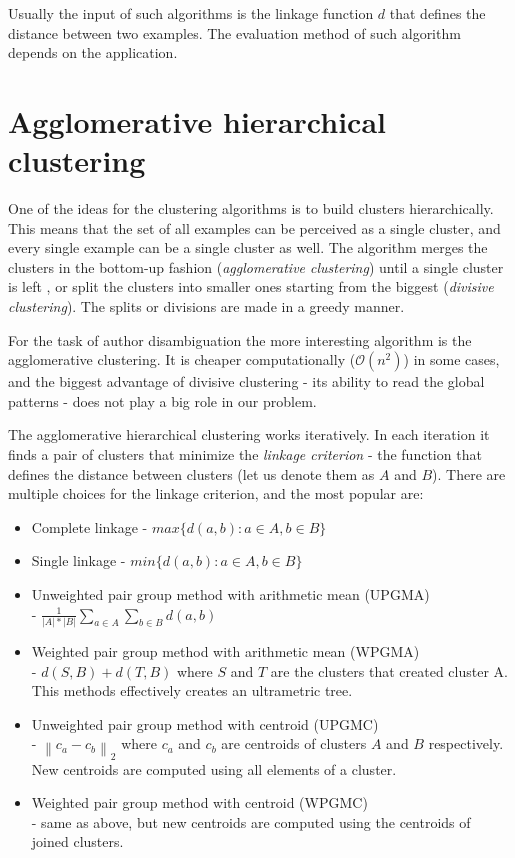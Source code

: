 \documentclass{pracamgr}
\begin{document}
Usually the input of such algorithms is the linkage function $d$ that defines the
distance between two examples. The evaluation method of such algorithm depends on the
application.

\section{Agglomerative hierarchical clustering}
One of the ideas for the clustering algorithms is to build clusters hierarchically. This means
that the set of all examples can be perceived as a single cluster, and every single example can be a single
cluster as well. The algorithm merges the clusters in the bottom-up fashion
(\textit{agglomerative clustering}) until a single cluster is left
\citep{ward1963hierarchical}, or split the clusters into smaller ones starting from the 
biggest (\textit{divisive clustering}). The splits or divisions are made in a greedy manner.

For the task of author disambiguation the more interesting algorithm is the agglomerative
clustering. It is cheaper computationally ($\mathcal{O}(n^{2})$) in some cases, and the
biggest advantage of divisive clustering - its ability to read the global patterns - does not
play a big role in our problem.

The agglomerative hierarchical clustering works iteratively. In each iteration it finds
a pair of clusters that minimize the \textit{linkage criterion} - the function
that defines the distance between clusters (let us denote them as $A$ and $B$). There are
multiple choices for the linkage criterion, and the most popular are:

\begin{itemize}
\item Complete linkage - $max \{d(a,b): a \in A, b \in B\}$
\item Single linkage - $min \{d(a,b): a \in A, b \in B\}$
\item Unweighted pair group method with arithmetic mean (UPGMA) \\
\citep{sokal1958astatistical} - $\frac{1}{|A|*|B|}\sum_{a \in A}\sum_{b \in B}d(a,b)$ 
\item Weighted pair group method with arithmetic mean (WPGMA) \\
\citep{sokal1958astatistical} - $d(S,B) + d(T,B)$ where $S$ and $T$ are the clusters
that created cluster A. This methods effectively creates an ultrametric tree.
\item Unweighted pair group method with centroid (UPGMC) \\
\citep{Sneath-Numerical-1973} - $\left\lVert c_{a} - c_{b}
\right\rVert_{2}$ where $c_{a}$ and $c_{b}$ are centroids of clusters $A$ and $B$
respectively. New centroids are computed using all elements of a cluster.
\item Weighted pair group method with centroid (WPGMC) \\
\citep{Sneath-Numerical-1973} - same as above, but new centroids
are computed using the centroids of joined clusters.
\end{itemize}
\end{document}
